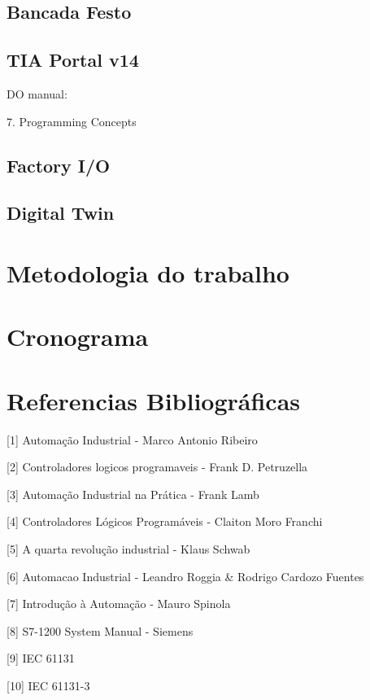 \documentclass[a4paper, 12pt]{article}
\begin{document}
	\subsection{Bancada Festo}
	
	\subsection{TIA Portal v14}
	
		DO manual:
		
		7. Programming Concepts
	
	\subsection{Factory I/O}
	
	\subsection{Digital Twin}

\section{Metodologia do trabalho}

\section{Cronograma}

\section{Referencias Bibliográficas}

[1] Automação Industrial - Marco Antonio Ribeiro

[2] Controladores logicos programaveis - Frank D. Petruzella

[3] Automação Industrial na Prática - Frank Lamb

[4] Controladores Lógicos Programáveis - Claiton Moro Franchi

[5] A quarta revolução industrial - Klaus Schwab

[6] Automacao Industrial - Leandro Roggia \& Rodrigo Cardozo Fuentes

[7] Introdução à Automação - Mauro Spinola

[8] S7-1200 System Manual - Siemens

[9] IEC 61131

[10] IEC 61131-3
\end{document}
